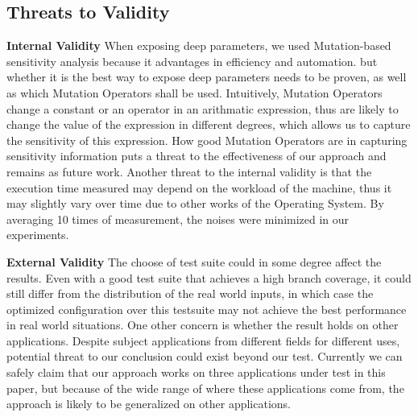 \subsection{Threats to Validity}

\textbf{Internal Validity}  When exposing deep parameters, we used Mutation-based sensitivity analysis because it advantages in efficiency and automation. but whether it is the best way to expose deep parameters needs to be proven, as well as which Mutation Operators shall be used. Intuitively, Mutation Operators change a constant or an operator in an arithmatic expression, thus are likely to change the value of the expression in different degrees, which allows us to capture the sensitivity of this expression. How good Mutation Operators are in capturing sensitivity information puts a threat to the effectiveness of our approach and remains as future work.
Another threat to the internal validity is that the execution time measured may depend on the workload of the machine, thus it may slightly vary over time due to other works of the Operating System. By averaging 10 times of measurement, the noises were minimized in our experiments.  

\textbf{External Validity}  The choose of test suite could in some degree affect the results. Even with a good test suite that achieves a high branch coverage, it could still differ from the distribution of the real world inputs, in which case the optimized configuration over this testsuite may not achieve the best performance in real world situations. 
One other concern is whether the result holds on other applications. Despite subject applications from different fields for different uses, potential threat to our conclusion could exist beyond our test. Currently we can safely claim that our approach works on three applications under test in this paper, but because of the wide range of where these applications come from, the approach is likely to be generalized on other applications.
